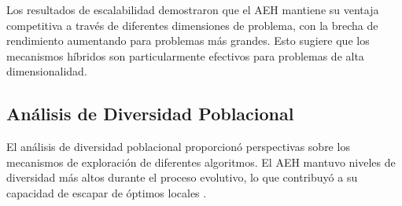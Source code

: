 \documentclass[10pt,a4paper]{article}
\begin{document}
\begin{multicols}{2}
\begin{table}[H]
\centering
\caption{Análisis de Escalabilidad por Dimensión de Problema}
\label{tab:scalability}
\end{table}

Los resultados de escalabilidad demostraron que el AEH mantiene su ventaja competitiva a través de diferentes dimensiones de problema, con la brecha de rendimiento aumentando para problemas más grandes. Esto sugiere que los mecanismos híbridos son particularmente efectivos para problemas de alta dimensionalidad.


\subsection{Análisis de Diversidad Poblacional}

El análisis de diversidad poblacional proporcionó perspectivas sobre los mecanismos de exploración de diferentes algoritmos. El AEH mantuvo niveles de diversidad más altos durante el proceso evolutivo, lo que contribuyó a su capacidad de escapar de óptimos locales .


\end{multicols}
\end{document}
